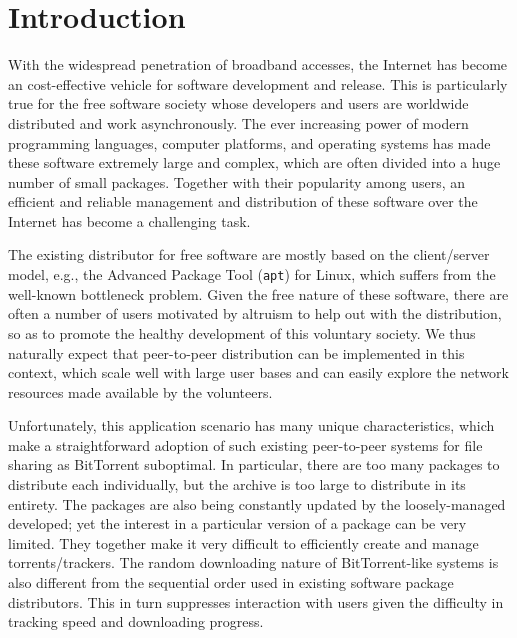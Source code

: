 \documentclass[conference]{IEEEtran}
\begin{document}

\section{Introduction}
\label{intro}

With the widespread penetration of broadband accesses, the Internet has become an cost-effective
vehicle for software development and release. This is particularly true for the free software
society whose developers and users are worldwide distributed and work asynchronously. The ever increasing power of
modern programming languages, computer platforms, and operating systems has made these software extremely large and complex,
which are often divided into a huge number of small packages.
Together with their popularity among users,
an efficient and reliable management and distribution of these software over the Internet has become a challenging task.

The existing distributor for free software are mostly based on the client/server model, e.g.,
the Advanced Package Tool (\texttt{apt}) for Linux, which suffers from the well-known bottleneck problem.
Given the free nature of these software, there are often a number of users
motivated by altruism to help out with the distribution, so as to promote the healthy development
of this voluntary society.
We thus naturally expect that peer-to-peer distribution can be implemented in
this context, which scale well with large user bases and can easily explore the network resources made available by
the volunteers.

Unfortunately, this application scenario has many unique characteristics, which
make a straightforward adoption of such existing peer-to-peer systems for file sharing as BitTorrent suboptimal. In particular,
there are too many packages to distribute each individually, but the archive is
too large to distribute in its entirety. The packages are also being constantly
updated by the loosely-managed developed; yet the interest in a particular version of a package can be very
limited. They together make it very difficult to efficiently create and manage torrents/trackers. The random downloading nature of BitTorrent-like systems is also different from the
sequential order used in existing software package distributors. This in turn suppresses interaction with users
given the difficulty in tracking speed and downloading progress.
\end{document}
